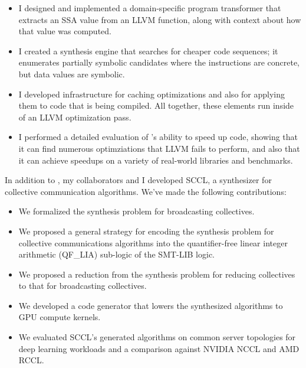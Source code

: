 \begin{itemize}
\item I designed and implemented a domain-specific program
transformer that extracts an SSA value from an LLVM function,
along with context about how that value was computed.

\item I created a synthesis engine that searches for cheaper code
sequences; it enumerates partially symbolic candidates where the
instructions are concrete, but data values are symbolic.

\item I developed infrastructure for caching optimizations and also
for applying them to code that is being compiled.
%
All together, these elements run inside of an LLVM optimization pass.

\item I performed a detailed evaluation of \minotaur's ability to
speed up code, showing that it can find numerous optimziations that
LLVM fails to perform, and also that it can achieve speedups on a
variety of real-world libraries and benchmarks.
\end{itemize}

In addition to \minotaur, my collaborators and I developed SCCL, a
synthesizer for collective communication algorithms. We've made the
following contributions:

\begin{itemize}
\item We formalized the synthesis problem for broadcasting
collectives.

\item We proposed a general strategy for encoding the synthesis
problem for collective communications algorithms into the
quantifier-free linear integer arithmetic (QF\_LIA) sub-logic of the
SMT-LIB logic.

\item We proposed a reduction from the synthesis problem for reducing collectives
to that for broadcasting collectives.

\item We developed a code generator that lowers the synthesized algorithms
to GPU compute kernels.

\item We evaluated SCCL's generated algorithms on common server
topologies for deep learning workloads and a comparison against NVIDIA NCCL
and AMD RCCL.

\end{itemize}

